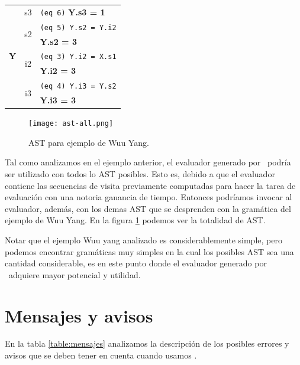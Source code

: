 \begin{center}
\begin{tabular}{|| c | c | l ||}
\multirow{7}{*}{\textbf{Y}} &                  s3 & \texttt{(eq 6)} \textbf{Y.s3 = 1} \\ \cline{2-3}
                           & \multirow{2}{*}{s2} &    \texttt{(eq 5) Y.s2 = Y.i2} \\
                           &                     & \textbf{Y.s2 = 3} \\ \cline{2-3}
                           & \multirow{2}{*}{i2} & \texttt{(eq 3) Y.i2 = X.s1} \\
                           &                     & \textbf{Y.i2 = 3} \\ \cline{2-3}
                           & \multirow{2}{*}{i3} & \texttt{(eq 4) Y.i3 = Y.s2} \\
                           &                     & \textbf{Y.i3 = 3} \\
\hline \hline


\end{tabular}\end{center}

\begin{figure}\centering
\texttt{[image: ast-all.png]}
\caption{\label{fig:allast} AST para ejemplo de Wuu Yang.}
\end{figure}

Tal como analizamos en el ejemplo anterior, el evaluador generado por \maggen\ podría ser utilizado con todos lo AST posibles. Esto es, debido a que el evaluador contiene las secuencias de visita previamente computadas para hacer la tarea de evaluación con una notoria ganancia de tiempo. Entonces podríamos invocar al evaluador, además, con los demas AST que se desprenden con la gramática del ejemplo de Wuu Yang. En la figura \ref{fig:allast} podemos ver la totalidad de AST.

Notar que el ejemplo Wuu yang analizado es considerablemente simple, pero podemos encontrar gramáticas muy simples en la cual los posibles AST sea una cantidad considerable, es en este punto donde el evaluador generado por \maggen\ adquiere mayor potencial y utilidad.

\section{Mensajes y avisos}

En la tabla \ref{table:mensajes} analizamos la descripción de los posibles errores y avisos que se deben tener en cuenta cuando usamos \maggen.
\newpage

